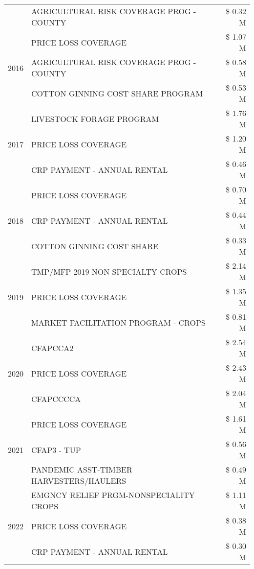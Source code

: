 \begin{tabular}{llr}
 & AGRICULTURAL RISK COVERAGE PROG - COUNTY & \$ 0.32 M \\
\cline{1-3}
\multirow[t]{3}{*}{2016} & PRICE LOSS COVERAGE & \$ 1.07 M \\
 & AGRICULTURAL RISK COVERAGE PROG - COUNTY & \$ 0.58 M \\
 & COTTON GINNING COST SHARE PROGRAM & \$ 0.53 M \\
\cline{1-3}
\multirow[t]{3}{*}{2017} & LIVESTOCK FORAGE PROGRAM & \$ 1.76 M \\
 & PRICE LOSS COVERAGE & \$ 1.20 M \\
 & CRP PAYMENT - ANNUAL RENTAL & \$ 0.46 M \\
\cline{1-3}
\multirow[t]{3}{*}{2018} & PRICE LOSS COVERAGE & \$ 0.70 M \\
 & CRP PAYMENT - ANNUAL RENTAL & \$ 0.44 M \\
 & COTTON GINNING COST SHARE & \$ 0.33 M \\
\cline{1-3}
\multirow[t]{3}{*}{2019} & TMP/MFP 2019 NON SPECIALTY CROPS & \$ 2.14 M \\
 & PRICE LOSS COVERAGE & \$ 1.35 M \\
 & MARKET FACILITATION PROGRAM - CROPS & \$ 0.81 M \\
\cline{1-3}
\multirow[t]{3}{*}{2020} & CFAPCCA2 & \$ 2.54 M \\
 & PRICE LOSS COVERAGE & \$ 2.43 M \\
 & CFAPCCCCA & \$ 2.04 M \\
\cline{1-3}
\multirow[t]{3}{*}{2021} & PRICE LOSS COVERAGE & \$ 1.61 M \\
 & CFAP3 - TUP & \$ 0.56 M \\
 & PANDEMIC ASST-TIMBER HARVESTERS/HAULERS & \$ 0.49 M \\
\cline{1-3}
\multirow[t]{3}{*}{2022} & EMGNCY RELIEF PRGM-NONSPECIALITY CROPS & \$ 1.11 M \\
 & PRICE LOSS COVERAGE & \$ 0.38 M \\
 & CRP PAYMENT - ANNUAL RENTAL & \$ 0.30 M \\
\cline{1-3}
\bottomrule
\end{tabular}
